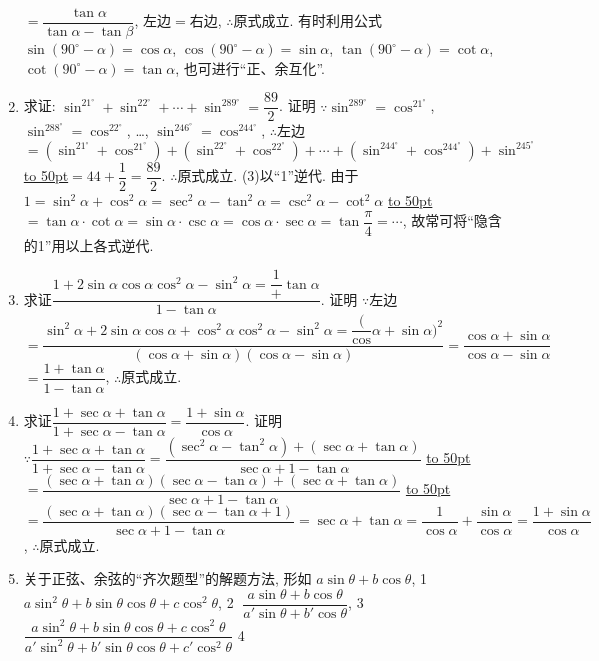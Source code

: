 \documentclass[10pt,a4paper]{article}
\newcommand{\blank}[1]{\underline{\hbox to #1pt{}}}
\begin{document}
\begin{enumerate}[1.]
$=\dfrac{\tan \alpha }{\tan \alpha -\tan \beta }$, 左边$=$右边,
$\therefore$原式成立.
有时利用公式$\sin (90^\circ -\alpha)=\cos \alpha$, $\cos (90^\circ -\alpha)=\sin \alpha$, $\tan (90^\circ -\alpha)=\cot \alpha$, $\cot (90^\circ -\alpha)=\tan \alpha$, 也可进行``正、余互化''.
\item 求证: $\sin ^21^\circ +\sin ^22^\circ +\cdots +\sin ^289^\circ =\dfrac{89}2$.
证明  $\because \sin ^289^\circ =\cos ^21^\circ$, $\sin ^288^\circ =\cos ^22^\circ$, …, $\sin ^246^\circ =\cos ^244^\circ$,
$\therefore$左边$=(\sin ^21^\circ +\cos ^21^\circ)+(\sin ^22^\circ +\cos ^22^\circ)+\cdots +(\sin ^244^\circ +\cos ^244^\circ)+\sin ^245^\circ$
\blank{50}$=44+\dfrac 12=\dfrac{89}2$.
$\therefore$原式成立.
(3)以``1''逆代.
由于$1=\sin ^2\alpha +\cos ^2\alpha =\sec ^2\alpha -\tan ^2\alpha =\csc ^2\alpha -\cot ^2\alpha$
\blank{50}$=\tan \alpha \cdot \cot \alpha =\sin \alpha \cdot \csc \alpha =\cos \alpha \cdot \sec \alpha =\tan \dfrac{\pi }4=\cdots$,
故常可将``隐含的1''用以上各式逆代.
\item 求证$\dfrac{1+2\sin \alpha \cos \alpha \cos ^2\alpha -\sin ^2\alpha =\dfrac 1+\tan \alpha }{1-\tan \alpha }$.
证明  $\because$左边$=\dfrac{\sin ^2\alpha +2\sin \alpha \cos \alpha +\cos ^2\alpha \cos ^2\alpha -\sin ^2\alpha =\dfrac (\cos \alpha +\sin \alpha)^2}{(\cos \alpha +\sin \alpha)(\cos \alpha -\sin \alpha)}=\dfrac{\cos \alpha +\sin \alpha }{\cos \alpha -\sin \alpha }$
$=\dfrac{1+\tan \alpha }{1-\tan \alpha }$,
$\therefore$原式成立.
\item 求证$\dfrac{1+\sec \alpha +\tan \alpha }{1+\sec \alpha -\tan \alpha }=\dfrac{1+\sin \alpha }{\cos \alpha }$.
证明  $\because \dfrac{1+\sec \alpha +\tan \alpha }{1+\sec \alpha -\tan \alpha }=\dfrac{(\sec ^2\alpha -\tan ^2\alpha)+(\sec \alpha +\tan \alpha)}{\sec \alpha +1-\tan \alpha }$
\blank{50}$=\dfrac{(\sec \alpha +\tan \alpha)(\sec \alpha -\tan \alpha)+(\sec \alpha +\tan \alpha)}{\sec \alpha +1-\tan \alpha }$
\blank{50}$=\dfrac{(\sec \alpha +\tan \alpha)(\sec \alpha -\tan \alpha +1)}{\sec \alpha +1-\tan \alpha }=\sec \alpha +\tan \alpha =\dfrac 1{\cos \alpha }+\dfrac{\sin \alpha }{\cos \alpha }=\dfrac{1+\sin \alpha }{\cos \alpha }$,
$\therefore$原式成立.
\item 关于正弦、余弦的``齐次题型''的解题方法, 形如
$a\sin \theta +b\cos \theta$, 							\textcircled{1}
$a\sin ^2\theta +b\sin \theta \cos \theta +c\cos ^2\theta$, 				\textcircled{2}
$\dfrac{a\sin \theta +b\cos \theta }{a'\sin \theta +b'\cos \theta }$, 							\textcircled{3}
$\dfrac{a\sin ^2\theta +b\sin \theta \cos \theta +c\cos ^2\theta }{a'\sin ^2\theta +b'\sin \theta \cos \theta +c'\cos ^2\theta }$				\textcircled{4}

\end{enumerate}
\end{document}
